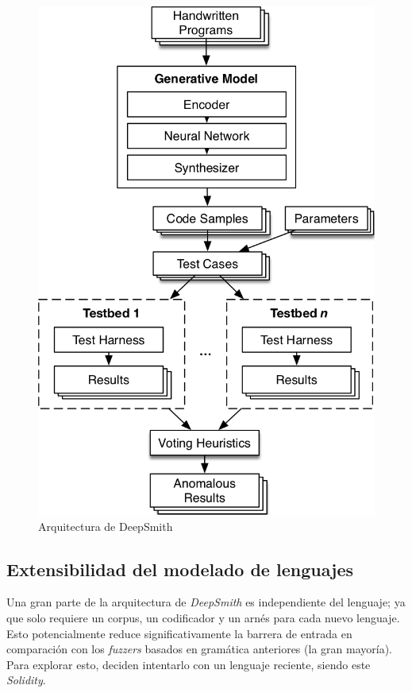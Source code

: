 \begin{figure}[ht]
    \centering
    \includegraphics[scale=0.5]{images/deepsmith1.png}
    \caption{Arquitectura de DeepSmith}
    \label{fig:deepsmith architecture}
\end{figure}


\subsection{Extensibilidad del modelado de lenguajes}

Una gran parte de la arquitectura de \textit{DeepSmith} es independiente del lenguaje; ya que solo requiere un corpus, un codificador y un arnés para cada nuevo lenguaje. Esto potencialmente reduce  significativamente la barrera de entrada en comparación con los \textit{fuzzers} basados en gramática anteriores (la gran mayoría). Para explorar esto, deciden intentarlo con un lenguaje reciente, siendo este \textit{Solidity}.\\

